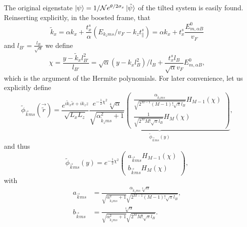 The original eigenstate \(\ket{\psi } = 1 /\mathcal{N} e^{\theta /2 \sigma _{x}} \ket{\tilde{\psi} }\) of the tilted system is easily found.
Reinserting explicitly, in the boosted frame, that
\[
  \tilde{k}_{x} = \alpha k_{x} + \frac{t^s_x}{\alpha} (E_{k_z m s} /v_F- k_{z} t^s_{\parallel})
  = \alpha k_x + t^s_x \frac{E^0_{m, \alpha B} }{v_{F}}
\]
and \(l_{B'}=\frac{l_{B}}{\sqrt{\alpha} }\)
we define
\begin{equation}
  \label{eq:36}
  \chi =
  \frac{y-\tilde{k}_{x} l_{B'}^2}{l_{B'}}
  =
  \sqrt{\alpha } (y-k_{x} l_{B}^2) /l_{B}
  + \frac{ t^s_x l_B }{ \sqrt{\alpha} v_F} E^{0}_{m, \alpha B},
\end{equation}
which is the argument of the Hermite polynomials.
For later convenience, let us explicitly define
\begin{equation}
  \label{eq:38}
  \tilde{\phi} _{\vec{k} m s} (\vec{\tilde{r}}) =
  \frac{e^{i \tilde{k}_{x} \tilde{x} + i k_{z} z}}{\sqrt{L_{x} L_{z}} }
  \underbrace{
  \frac{
    e^{-\frac{1}{2} \chi ^2}
    \sqrt[4]{\alpha }
  }
  {\sqrt{\alpha^2_{\tilde{k}_{z} m s} + 1} }
  \begin{pmatrix}
    \frac{\alpha_{\tilde{k}_z m s}}{\sqrt{2^{M-1} (M-1)! \sqrt{\pi } l_{B}}} H_{M-1}\left( \chi  \right)\\
    \frac{1}{\sqrt{2^M M! \sqrt{\pi } l_{B}}} H_M \left( \chi \right)
  \end{pmatrix}}_{\tilde{\phi}_{\vec{k} m s} (y)},
\end{equation}
and thus
\begin{equation}
  \label{eq:39}
  \tilde{\phi}_{\vec{k} m s} (y) =
  e^{-\frac{1}{2} \chi ^2}
  \begin{pmatrix}
    a_{\vec{k} m s} H_{M-1} (\chi)\\
    b_{\vec{k} m s} H_{M} (\chi)
  \end{pmatrix},
\end{equation}
with
\begin{align}
 \label{eq:40}
  a_{\vec{k} m s} &=
                    \frac{
                    \alpha_{\tilde{k}_z m s} \sqrt[4]{\alpha }
                    }{
                    \sqrt{\alpha^2 _{\tilde{k}_z m s} + 1}
                    \sqrt{2^{M-1} (M-1)! \sqrt{\pi} l_B}
                    },\\
  \label{eq:107}
  b_{\vec{k} m s} &=
                    \frac{
                     \sqrt[4]{\alpha }
                    }{
                    \sqrt{\alpha^2 _{\tilde{k}_z m s} + 1}
                    \sqrt{2^{M} M! \sqrt{\pi} l_B}
                    }.
\end{align}

